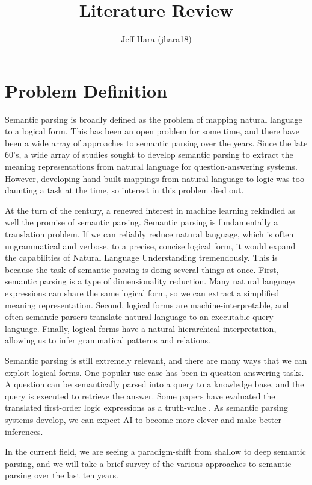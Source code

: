 \documentclass[a4paper]{article}
\title{Literature Review}
\author{Jeff Hara (jhara18)}
\theoremstyle{definition}
\begin{document}
\maketitle

\section{Problem Definition}

\quad Semantic parsing is broadly defined as the problem of mapping natural language to a logical form. This has been an open problem for some time, and there have been a wide array of approaches to semantic parsing over the years. Since the late 60's, a wide array of studies sought to develop semantic parsing to extract the meaning representations from natural language for question-answering systems\cite{Woods77}. However, developing hand-built mappings from natural language to logic was too daunting a task at the time, so interest in this problem died out.

\quad At the turn of the century, a renewed interest in machine learning rekindled as well the promise of semantic parsing. Semantic parsing is fundamentally a translation problem. If we can reliably reduce natural language, which is often ungrammatical and verbose, to a precise, concise logical form, it would expand the capabilities of Natural Language Understanding tremendously. This is because the task of semantic parsing is doing several things at once. First, semantic parsing is a type of dimensionality reduction. Many natural language expressions can share the same logical form, so we can extract a simplified meaning representation. Second, logical forms are machine-interpretable, and often semantic parsers translate natural language to an executable query language. Finally, logical forms have a natural hierarchical interpretation, allowing us to infer grammatical patterns and relations.

\quad Semantic parsing is still extremely relevant, and there are many ways that we can exploit logical forms. One popular use-case has been in question-answering tasks. A question can be semantically parsed into a query to a knowledge base, and the query is executed to retrieve the answer. Some papers have evaluated the translated first-order logic expressions as a truth-value \cite{jha2011}. As semantic parsing systems develop, we can expect AI to become more clever and make better inferences.

\quad In the current field, we are seeing a paradigm-shift from shallow  to deep semantic parsing, and we will take a brief survey of the various approaches to semantic parsing over the last ten years.
\end{document}
